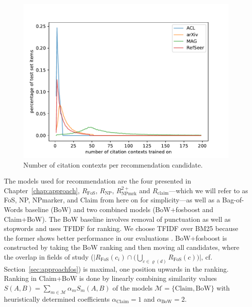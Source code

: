 \begin{figure}[tb]
  \centering
    \includegraphics[width=.8\textwidth]{figures/evaluation/comparison_contexts_per_cited_doc.pdf}
  \caption{Number of citation contexts per recommendation candidate.}
  \label{fig:evalcomp}
\end{figure}


The models used for recommendation are the four presented in Chapter~\ref{chap:approach}, ${R_{\text{FoS}}}$, ${R_{\text{NP}}}$, ${R_{\text{NPmrk}}^{2+}}$ and $R_{\text{claim}}$---which we will refer to as FoS, NP, NPmarker, and Claim from here on for simplicity---as well as a Bag-of-Words baseline (BoW) and two combined models (BoW+fosboost and Claim+BoW). The BoW baseline involves removal of punctuation as well as stopwords and uses TFIDF for ranking. We choose TFIDF over BM25 because the former shows better performance in our evaluations%
. BoW+fosboost is constructed by taking the BoW ranking and then moving all candidates, where the overlap in fields of study (${\big|R_{\text{FoS}}(c_i)\cap\big(\bigcup\limits_{c \in \varrho(d)} R_{\text{FoS}}(c)\big)\big|}$, cf. Section~\ref{sec:approachfos}) is maximal, one position upwards in the ranking. Ranking in Claim+BoW is done by linearly combining similarity values $S(A,B)=\sum\limits_{m\in\mathcal{M}}\alpha_mS_m(A,B)$ of the models $\mathcal{M}=\{\text{Claim},\text{BoW}\}$ with heuristically determined coefficients $\alpha_{\text{Claim}}=1$ and $\alpha_{\text{BoW}}=2$.

